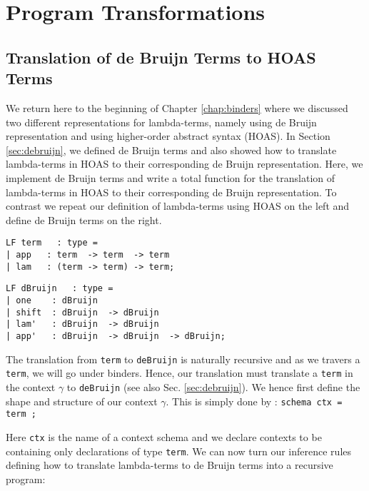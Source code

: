 \chapter{Program Transformations }
\section{Translation of de Bruijn Terms to HOAS Terms}
We return here to the beginning of Chapter \ref{chap:binders} where we discussed two different representations for lambda-terms, namely using de Bruijn representation and using higher-order abstract syntax (HOAS). In Section \ref{sec:debruijn}, we defined de Bruijn terms and also showed how to translate lambda-terms in HOAS to their corresponding de Bruijn representation. Here, we implement de Bruijn terms and write a total function for the translation of lambda-terms in HOAS to their corresponding  de Bruijn representation.  To contrast we repeat our definition of lambda-terms using HOAS on the left and define de Bruijn terms on the right.

\begin{minipage}[t]{7cm}
\begin{lstlisting}
LF term   : type =
| app   : term  -> term  -> term
| lam   : (term -> term) -> term;
  \end{lstlisting}
\end{minipage}
\begin{minipage}[t]{7cm}
\begin{lstlisting}
LF dBruijn   : type =
| one    : dBruijn
| shift  : dBruijn  -> dBruijn
| lam'   : dBruijn  -> dBruijn
| app'   : dBruijn  -> dBruijn  -> dBruijn;
\end{lstlisting}
\end{minipage}

The translation from \lstinline!term! to \lstinline!deBruijn! is naturally recursive and as we travers a \lstinline!term!, we will go under binders. Hence, our translation must translate a \lstinline!term! in the context $\gamma$ to \lstinline!deBruijn! (see also Sec. \ref{sec:debruijn}).
We hence first define the shape and structure of our context $\gamma$. This is
simply done by : \lstinline!schema ctx = term ; !


Here \lstinline!ctx! is the name of a context schema and we declare
contexts to be containing only declarations of type \lstinline!term!.
We can now turn our inference rules defining how to translate
lambda-terms to de Bruijn terms into a recursive program:


